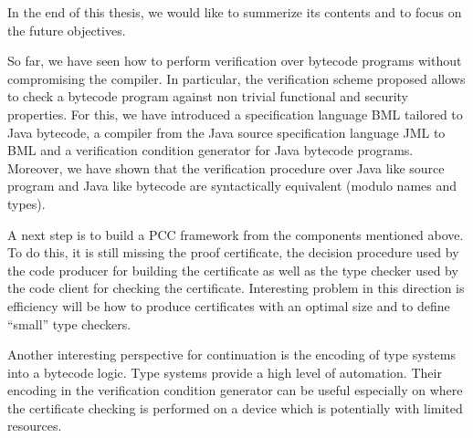 
In the end of this thesis, we would like to summerize 
its contents and to focus on the future objectives. 

So far, we have seen how to perform verification over bytecode
programs without compromising the compiler. In particular, the verification 
scheme proposed allows to check a bytecode program against 
non trivial functional and security properties. For this, we have 
introduced a specification language BML tailored to Java bytecode, a compiler
from the Java source specification language JML to BML and a verification 
condition generator for Java bytecode programs. Moreover, we have
shown that the verification procedure over Java like source program 
and Java like bytecode are syntactically equivalent (modulo names and types). 

A next step is to build a PCC framework from the  components 
mentioned above. To do this,  it is still missing the proof
certificate, the decision procedure used by the code producer 
for building the certificate  as well as the type checker used by the code
client for checking the certificate. Interesting problem 
in this direction is efficiency 
will be how to produce certificates with an
optimal size and to define ``small'' type checkers.

Another interesting perspective for continuation is the encoding 
of type systems into a bytecode logic. 
Type systems provide a high level of automation. 
Their encoding in the verification condition generator can be useful
especially on where the certificate checking is performed on a 
 device which is potentially with limited resources.

